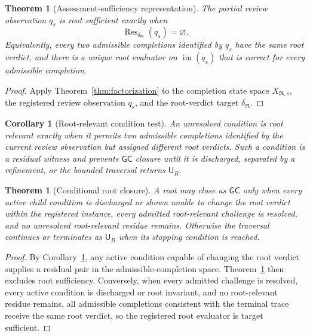 \documentclass[10pt]{article}
\newtheorem{theorem}[definition]{Theorem}
\newtheorem{corollary}[definition]{Corollary}
\newcommand{\Res}{\operatorname{Res}}
\newcommand{\GC}{\mathsf{GC}}
\newcommand{\UB}{\mathsf{U}_B}
\begin{document}
\begin{theorem}[Assessment-sufficiency representation]\label{thm:assessment-bridge}
The partial review observation $q_s$ is root sufficient exactly when
\[
 \Res_{\delta_{\mathfrak R}}(q_s)=\varnothing.
\]
Equivalently, every two admissible completions identified by $q_s$ have the same root verdict, and there is a unique root evaluator on $\operatorname{im}(q_s)$ that is correct for every admissible completion.
\end{theorem}

\begin{proof}
Apply Theorem~\ref{thm:factorization} to the completion state space $X_{\mathfrak R,s}$, the registered review observation $q_s$, and the root-verdict target $\delta_{\mathfrak R}$.
\end{proof}

\begin{corollary}[Root-relevant condition test]\label{cor:condition-test}
An unresolved condition is root relevant exactly when it permits two admissible completions identified by the current review observation but assigned different root verdicts.  Such a condition is a residual witness and prevents $\GC$ closure until it is discharged, separated by a refinement, or the bounded traversal returns $\UB$.
\end{corollary}

\begin{theorem}[Conditional root closure]\label{thm:conditional-root}
A root may close as $\GC$ only when every active child condition is discharged or shown unable to change the root verdict within the registered instance, every admitted root-relevant challenge is resolved, and no unresolved root-relevant residue remains.  Otherwise the traversal continues or terminates as $\UB$ when its stopping condition is reached.
\end{theorem}

\begin{proof}
By Corollary~\ref{cor:condition-test}, any active condition capable of changing the root verdict supplies a residual pair in the admissible-completion space.  Theorem~\ref{thm:assessment-bridge} then excludes root sufficiency.  Conversely, when every admitted challenge is resolved, every active condition is discharged or root invariant, and no root-relevant residue remains, all admissible completions consistent with the terminal trace receive the same root verdict, so the registered root evaluator is target sufficient.
\end{proof}
\end{document}
